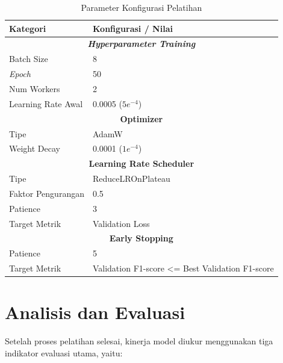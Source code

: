 \begin{table}[H]
\centering
\caption{Parameter Konfigurasi Pelatihan}
\label{tab:parameter_latih}
\renewcommand{\arraystretch}{1.3} %
\begin{tabular}{|l|l|}
\hline
\textbf{Kategori} & \textbf{Konfigurasi / Nilai} \\ \hline
\multicolumn{2}{|c|}{\textbf{\textit{Hyperparameter Training}}} \\ \hline
Batch Size & 8 \\ \hline
\textit{Epoch} & 50 \\ \hline
Num Workers & 2 \\ \hline
Learning Rate Awal & 0.0005 ($5e^{-4}$) \\ \hline
\multicolumn{2}{|c|}{\textbf{Optimizer}} \\ \hline
Tipe & AdamW \\ \hline
Weight Decay & 0.0001 ($1e^{-4}$) \\ \hline
\multicolumn{2}{|c|}{\textbf{Learning Rate Scheduler}} \\ \hline
Tipe & ReduceLROnPlateau \\ \hline
Faktor Pengurangan & 0.5 \\ \hline
Patience & 3 \\ \hline
Target Metrik & Validation Loss \\ \hline
\multicolumn{2}{|c|}{\textbf{Early Stopping}} \\ \hline
Patience & 5 \\ \hline
Target Metrik & Validation F1-score \textless= Best Validation F1-score \\ \hline
\end{tabular}
\end{table}

\section{Analisis dan Evaluasi} \label{sec:evaluasi}
Setelah proses pelatihan selesai, kinerja model diukur menggunakan tiga indikator evaluasi utama, yaitu:

